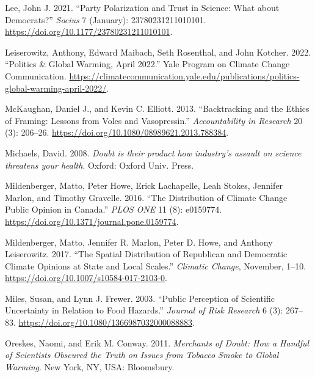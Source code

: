 \documentclass[
  letterpaper,
  DIV=11,
  numbers=noendperiod]{scrartcl}
\newlength{\cslhangindent}
\newlength{\cslentryspacingunit} %
\newenvironment{CSLReferences}[2] %
 {%
  \setlength{\parindent}{0pt}
  \ifodd #1
  \let\oldpar\par
  \def\par{\hangindent=\cslhangindent\oldpar}
  \fi
  \setlength{\parskip}{#2\cslentryspacingunit}
 }%
 {}
\begin{document}
\begin{CSLReferences}{1}{0}
\leavevmode{}%
Lee, John J. 2021. {``Party Polarization and Trust in Science: What
about Democrats?''} \emph{Socius} 7 (January): 23780231211010101.
\url{https://doi.org/10.1177/23780231211010101}.

\leavevmode{}%
Leiserowitz, Anthony, Edward Maibach, Seth Rosenthal, and John Kotcher.
2022. {``Politics \& Global Warming, April 2022.''} Yale Program on
Climate Change Communication.
\url{https://climatecommunication.yale.edu/publications/politics-global-warming-april-2022/}.

\leavevmode{}%
McKaughan, Daniel J., and Kevin C. Elliott. 2013. {``Backtracking and
the Ethics of Framing: Lessons from Voles and Vasopressin.''}
\emph{Accountability in Research} 20 (3): 206--26.
\url{https://doi.org/10.1080/08989621.2013.788384}.

\leavevmode{}%
Michaels, David. 2008. \emph{Doubt is their product how industry's
assault on science threatens your health}. Oxford: Oxford Univ. Press.

\leavevmode{}%
Mildenberger, Matto, Peter Howe, Erick Lachapelle, Leah Stokes, Jennifer
Marlon, and Timothy Gravelle. 2016. {``The Distribution of Climate
Change Public Opinion in Canada.''} \emph{PLOS ONE} 11 (8): e0159774.
\url{https://doi.org/10.1371/journal.pone.0159774}.

\leavevmode{}%
Mildenberger, Matto, Jennifer R. Marlon, Peter D. Howe, and Anthony
Leiserowitz. 2017. {``The Spatial Distribution of Republican and
Democratic Climate Opinions at State and Local Scales.''} \emph{Climatic
Change}, November, 1--10.
\url{https://doi.org/10.1007/s10584-017-2103-0}.

\leavevmode{}%
Miles, Susan, and Lynn J. Frewer. 2003. {``Public Perception of
Scientific Uncertainty in Relation to Food Hazards.''} \emph{Journal of
Risk Research} 6 (3): 267--83.
\url{https://doi.org/10.1080/1366987032000088883}.

\leavevmode{}%
Oreskes, Naomi, and Erik M. Conway. 2011. \emph{Merchants of Doubt: How
a Handful of Scientists Obscured the Truth on Issues from Tobacco Smoke
to Global Warming}. New York, NY, USA: Bloomsbury.


\end{CSLReferences}
\end{document}
